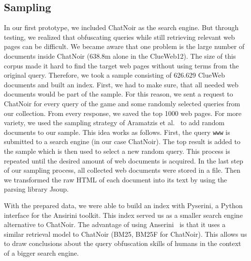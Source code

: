 \subsection{Sampling}
In our first prototype, we included ChatNoir as the search engine. But through testing, we realized that obfuscating queries while still retrieving relevant web pages can be difficult. We became aware that one problem is the large number of documents inside ChatNoir (638.8m alone in the ClueWeb12). The size of this corpus made it hard to find the target web pages without using terms from the original query. Therefore, we took a sample consisting of 626.629 ClueWeb documents and built an index.
First, we had to make sure, that all needed web documents would be part of the sample. For this reason, we sent a request to ChatNoir for every query of the game and some randomly selected queries from our collection. From every response, we saved the top 1000 web pages. For more variety, we used the sampling strategy of Aramatzis et al.~\cite{arampatzis} to add random documents to our sample. This idea works as follows. First, the query \texttt{www} is submitted to a search engine (in our case ChatNoir). The top result is added to the sample which is then used to select a new random query. This process is repeated until the desired amount of web documents is acquired. In the last step of our sampling process, all collected web documents were stored in a file. Then we transformed the raw HTML of each document into its text by using the parsing library Jsoup.\par
With the prepared data, we were able to build an index with Pyserini, a Python interface for the Ansirini toolkit. This index served us as a smaller search engine alternative to ChatNoir. The advantage of using Anserini~\cite{anserini} is that it uses a similar retrieval model to ChatNoir (BM25, BM25F for ChatNoir). This allows us to draw conclusions about the query obfuscation skills of humans in the context of a bigger search engine. 

